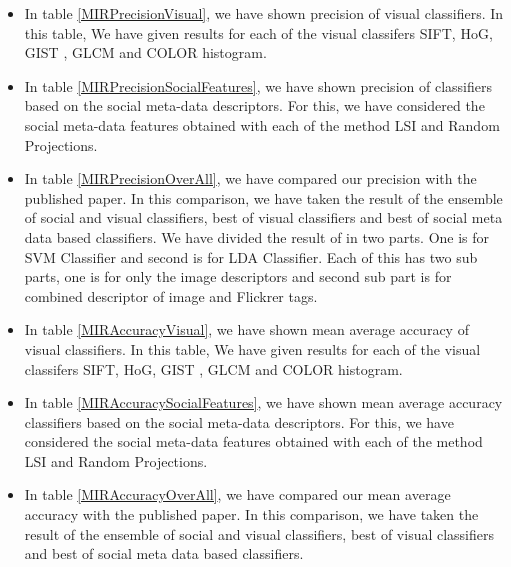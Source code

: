 \begin{itemize}
\item In table \ref{MIRPrecisionVisual}, we have shown precision of visual classifiers. In this table, We have given results for each of the visual classifers SIFT, HoG, GIST , GLCM and COLOR histogram.
\item In table \ref{MIRPrecisionSocialFeatures}, we have shown precision of classifiers based on the social meta-data descriptors. For this, we have considered the social meta-data features obtained with each of the method LSI and Random Projections.
\item In table \ref{MIRPrecisionOverAll}, we have compared our precision with the published paper. In this comparison, we have taken the result of the ensemble of social and visual classifiers,  best of visual classifiers and best of social meta data based classifiers. We have divided the result of \citep{MIRresults} in two parts. One is for SVM Classifier and second is for LDA Classifier. Each of this has two sub parts, one is for only the image descriptors and second sub part is for combined descriptor of image and Flickrer tags.
\item In table \ref{MIRAccuracyVisual}, we have shown mean average accuracy of visual classifiers. In this table, We have given results for each of the visual classifers SIFT, HoG, GIST , GLCM and COLOR histogram.
\item In table \ref{MIRAccuracySocialFeatures}, we have shown mean average accuracy classifiers based on the social meta-data descriptors. For this, we have considered the social meta-data features obtained with each of the method LSI and Random Projections.
\item In table \ref{MIRAccuracyOverAll}, we have compared our mean average accuracy with the published paper. In this comparison, we have taken the result of the ensemble of social and visual classifiers,  best of visual classifiers and best of social meta data based classifiers.
\end{itemize}

